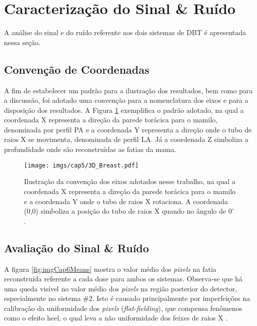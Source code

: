 \clearpage


\section{Caracterização do Sinal  \& Ruído} 

A análise do sinal e do ruído referente aos dois sistemas de \acs{DBT} é apresentada nessa seção. 

\subsection{Convenção de Coordenadas}

A fim de estabelecer um padrão para a ilustração dos resultados, bem como para a discussão, foi adotado uma convenção para a nomenclatura dos eixos e para a disposição dos resultados. A Figura \ref{fig:imgCap63DVolume} exemplifica o padrão adotado, na qual a coordenada X representa a direção da parede torácica para o mamilo, denominada por perfil \ac{PA} e a coordenada Y representa a direção onde o tubo de raios X se movimenta, denominada de perfil \ac{LA}. Já a coordenada Z simboliza a profundidade onde são reconstruídas as fatias da mama.

\begin{figure}[H]
	\caption{Ilustração da convenção dos eixos adotados nesse trabalho, na qual a coordenada X representa a direção da parede torácica para o mamilo e a coordenada Y onde o tubo de raios X rotaciona. A coordenada (0,0) simboliza a posição do tubo de raios X quando no ângulo de $0^{\circ}$.}
	\begin{center}
		\texttt{[image: imgs/cap5/3D\_Breast.pdf]}
	\end{center}
	\label{fig:imgCap63DVolume}
\end{figure} 

\subsection{Avaliação do Sinal  \& Ruído}


A figura \ref{fig:imgCap6Means} mostra o valor médio dos \textit{pixels} na fatia reconstruída referente a cada dose para ambos os sistemas. Observa-se que há uma queda visível no valor médio dos \textit{pixels} na região posterior do detector, especialmente no sistema \#2. Isto é causado principalmente por imperfeições na calibração da uniformidade dos \textit{pixels} (\textit{flat-fielding}), que compensa fenômenos como o efeito heel, o qual leva a não uniformidade dos feixes de raios X \cite[p. 485]{marshall2017handbook}.


